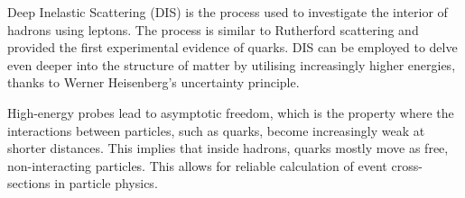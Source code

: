 Deep Inelastic Scattering (DIS) is the process used to investigate the interior of hadrons using leptons.
The process is similar to Rutherford scattering and provided the first experimental evidence of quarks.
DIS can be employed to delve even deeper into the structure of matter by utilising increasingly higher energies, thanks to Werner Heisenberg's uncertainty principle.

High-energy probes lead to asymptotic freedom, which is the property where the interactions between particles, such as quarks, become increasingly weak at shorter distances.
This implies that inside hadrons, quarks mostly move as free, non-interacting particles.
This allows for reliable calculation of event cross-sections in particle physics.
